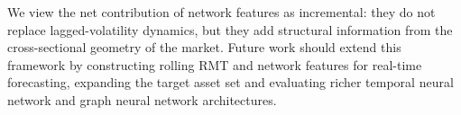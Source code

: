 We view the net contribution of network features as incremental: they do not replace lagged-volatility dynamics, but they add structural information from the cross-sectional geometry of the market. Future work should extend this framework by constructing rolling RMT and network features for real-time forecasting, expanding the target asset set and evaluating richer temporal neural network and graph neural network architectures.
